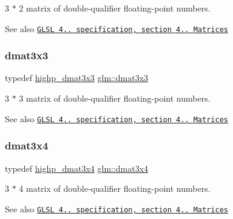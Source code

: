 3 $\ast$ 2 matrix of double-\/qualifier floating-\/point numbers.

\begin{DoxySeeAlso}{See also}
\href{http://www.opengl.org/registry/doc/GLSLangSpec.4.20.8.pdf}{\tt G\+L\+SL 4.. specification, section 4.. Matrices} 
\end{DoxySeeAlso}
\mbox{\label{group__core__types_gaf3c29c4f75a448f308463e75ca2efd4c}} 
\subsubsection{\texorpdfstring{dmat3x3}{dmat3x3}}
{\footnotesize\ttfamily typedef \mbox{\hyperlink{group__core__precision_gae5f677e4437523476511c84a17206ac2}{highp\+\_\+dmat3x3}} \mbox{\hyperlink{group__core__types_gaf3c29c4f75a448f308463e75ca2efd4c}{glm\+::dmat3x3}}}

3 $\ast$ 3 matrix of double-\/qualifier floating-\/point numbers.

\begin{DoxySeeAlso}{See also}
\href{http://www.opengl.org/registry/doc/GLSLangSpec.4.20.8.pdf}{\tt G\+L\+SL 4.. specification, section 4.. Matrices} 
\end{DoxySeeAlso}
\mbox{\label{group__core__types_ga19e745a83cba85f57afa1232276dcc96}} 
\subsubsection{\texorpdfstring{dmat3x4}{dmat3x4}}
{\footnotesize\ttfamily typedef \mbox{\hyperlink{group__core__precision_ga21d3883c59ff3949404de6713e86c89e}{highp\+\_\+dmat3x4}} \mbox{\hyperlink{group__core__types_ga19e745a83cba85f57afa1232276dcc96}{glm\+::dmat3x4}}}

3 $\ast$ 4 matrix of double-\/qualifier floating-\/point numbers.

\begin{DoxySeeAlso}{See also}
\href{http://www.opengl.org/registry/doc/GLSLangSpec.4.20.8.pdf}{\tt G\+L\+SL 4.. specification, section 4.. Matrices} 
\end{DoxySeeAlso}
\mbox{\label{group__core__types_ga7f7c1300ebfd19d573e9deb1e8758b54}} 
